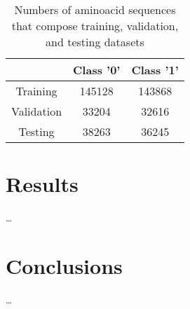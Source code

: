 \documentclass[12pt]{report}
\begin{document}
	\begin{table}[h!]
		\caption{Numbers of aminoacid sequences that compose training, 
		validation, and testing datasets}
		\label{table:2} 
		\vspace{0.2cm}
		\centering
		\begin{tabular}{ | c | c | c | }
			\hline 
			& Class '0' & Class '1' \\
			\hline 
			Training & 145128 & 143868 \\
			\hline  
			Validation & 33204 & 32616 \\
			\hline 
			Testing & 38263 & 36245 \\
			\hline    
		\end{tabular}
	\end{table}

	\newpage

	\section{Results}

	\dots

	\section{Conclusions}

	\dots

	\nocite{*}
	
	\normalsize

 

\end{document}
